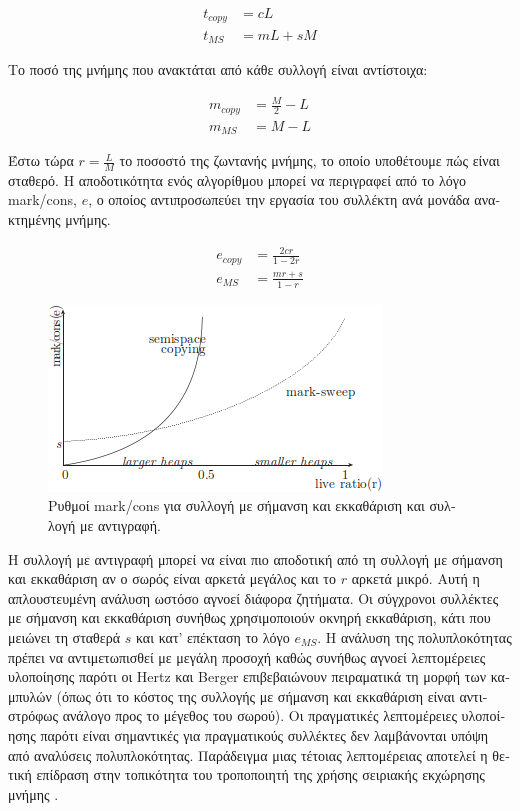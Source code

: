 \begin{greek}
\begin{align}
t_{copy} &= cL \\
 t_{MS} &= mL+sM
\end{align}

Το ποσό της μνήμης που ανακτάται από κάθε συλλογή είναι αντίστοιχα:

\begin{align}
m_{copy} &= \frac{M}{2}-L \\
 m_{MS} &= M-L
\end{align}

Έστω τώρα $r=\frac{L}{M}$ το ποσοστό της ζωντανής μνήμης, το
οποίο υποθέτουμε πώς είναι σταθερό. Η αποδοτικότητα ενός αλγορίθμου
μπορεί να περιγραφεί από το λόγο mark/cons, $e$, ο οποίος αντιπροσωπεύει
την εργασία του συλλέκτη ανά μονάδα ανακτημένης μνήμης.

\begin{align}
e_{copy} &= \frac{2cr}{1-2r} \\
 e_{MS} &= \frac{mr+s}{1-r}
\end{align}

\begin{figure}
  \centering
  \includegraphics{figures/cop_5}
  \caption[Ρυθμοί mark/cons για συλλογή με σήμανση και εκκαθάριση
           και συλλογή με αντιγραφή.]
    {Ρυθμοί mark/cons για συλλογή με σήμανση και εκκαθάριση και
     συλλογή με αντιγραφή.}
  \label{fig:cop_5}
\end{figure}

Η συλλογή με αντιγραφή μπορεί να είναι πιο αποδοτική από τη
συλλογή με σήμανση και εκκαθάριση αν ο σωρός είναι αρκετά μεγάλος
και το $r$ αρκετά μικρό. Αυτή η απλουστευμένη ανάλυση ωστόσο
αγνοεί διάφορα ζητήματα. Οι σύγχρονοι συλλέκτες με σήμανση
και εκκαθάριση συνήθως χρησιμοποιούν οκνηρή εκκαθάριση, κάτι
που μειώνει τη σταθερά $s$ και κατ' επέκταση το λόγο $e_{MS}$.
Η ανάλυση της πολυπλοκότητας πρέπει να αντιμετωπισθεί με μεγάλη
προσοχή καθώς συνήθως αγνοεί λεπτομέρειες υλοποίησης παρότι
οι Hertz και Berger \cite{DBLP:conf/oopsla/HertzB05} επιβεβαιώνουν πειραματικά τη μορφή 
των καμπυλών (όπως ότι το κόστος της συλλογής με σήμανση και
εκκαθάριση είναι αντιστρόφως ανάλογο προς το μέγεθος του σωρού).
Οι πραγματικές λεπτομέρειες υλοποίησης παρότι είναι σημαντικές 
για πραγματικούς συλλέκτες δεν λαμβάνονται υπόψη από αναλύσεις
πολυπλοκότητας. Παράδειγμα μιας τέτοιας λεπτομέρειας αποτελεί
η θετική επίδραση στην τοπικότητα του τροποποιητή της χρήσης
σειριακής εκχώρησης μνήμης \cite{DBLP:conf/icse/BlackburnCM04}.


\end{greek}
